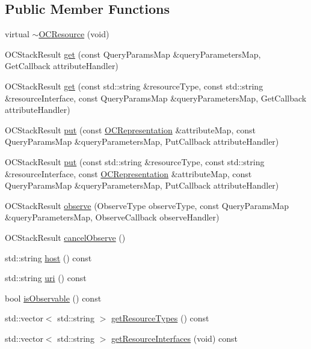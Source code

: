 \subsection*{Public Member Functions}
\begin{DoxyCompactItemize}
\item 
virtual \hyperlink{classOC_1_1OCResource_afef4121f1e3f26d006d4e048f9e8adb8}{$\sim$\+O\+C\+Resource} (void)
\item 
O\+C\+Stack\+Result \hyperlink{classOC_1_1OCResource_a50277fe41aab5c2f2f44e5f48b20adce}{get} (const Query\+Params\+Map \&query\+Parameters\+Map, Get\+Callback attribute\+Handler)
\item 
O\+C\+Stack\+Result \hyperlink{classOC_1_1OCResource_a9cae757d4e055fce247d46495a14bb23}{get} (const std\+::string \&resource\+Type, const std\+::string \&resource\+Interface, const Query\+Params\+Map \&query\+Parameters\+Map, Get\+Callback attribute\+Handler)
\item 
O\+C\+Stack\+Result \hyperlink{classOC_1_1OCResource_a9d511e4b01f4a1c9b62a952dd6108316}{put} (const \hyperlink{classOC_1_1OCRepresentation}{O\+C\+Representation} \&attribute\+Map, const Query\+Params\+Map \&query\+Parameters\+Map, Put\+Callback attribute\+Handler)
\item 
O\+C\+Stack\+Result \hyperlink{classOC_1_1OCResource_a2f64359f8d1ee8da106ce8405dbc2d27}{put} (const std\+::string \&resource\+Type, const std\+::string \&resource\+Interface, const \hyperlink{classOC_1_1OCRepresentation}{O\+C\+Representation} \&attribute\+Map, const Query\+Params\+Map \&query\+Parameters\+Map, Put\+Callback attribute\+Handler)
\item 
O\+C\+Stack\+Result \hyperlink{classOC_1_1OCResource_a21067c10b2ced4d8f1460ec004a861ed}{observe} (Observe\+Type observe\+Type, const Query\+Params\+Map \&query\+Parameters\+Map, Observe\+Callback observe\+Handler)
\item 
O\+C\+Stack\+Result \hyperlink{classOC_1_1OCResource_a231a10e9e0cb82c01eaf52f70cd5e563}{cancel\+Observe} ()
\item 
std\+::string \hyperlink{classOC_1_1OCResource_a5c46e683fb2692d2f075734a871ae059}{host} () const 
\item 
std\+::string \hyperlink{classOC_1_1OCResource_a7cf20cfc16aecffcda44bff45f701bc2}{uri} () const 
\item 
bool \hyperlink{classOC_1_1OCResource_a2eba6b827fc308e8b69ff30675380639}{is\+Observable} () const 
\item 
std\+::vector$<$ std\+::string $>$ \hyperlink{classOC_1_1OCResource_a1a9f55284d25e9512fca799694d37e45}{get\+Resource\+Types} () const 
\item 
std\+::vector$<$ std\+::string $>$ \hyperlink{classOC_1_1OCResource_a0bd4b976d0ed40c3033c70803046bd77}{get\+Resource\+Interfaces} (void) const 
\end{DoxyCompactItemize}
